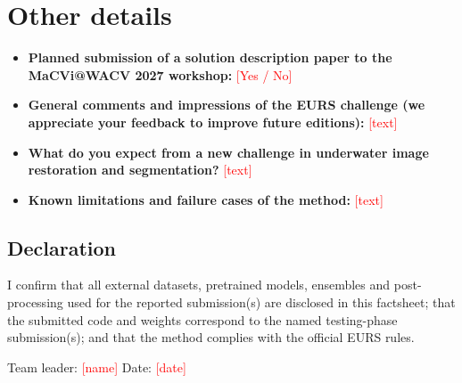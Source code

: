 \documentclass{article}
\newcommand{\todo}[1]{\textcolor{red}{[#1]}}
\begin{document}
\section{Other details}
\begin{itemize}
\item \textbf{Planned submission of a solution description paper to the MaCVi@WACV 2027 workshop:} \todo{Yes / No}
\item \textbf{General comments and impressions of the EURS challenge (we appreciate your feedback to improve future editions):} \todo{text}
\item \textbf{What do you expect from a new challenge in underwater image restoration and segmentation?} \todo{text}
\item \textbf{Known limitations and failure cases of the method:} \todo{text}
\end{itemize}

\subsection*{Declaration}
I confirm that all external datasets, pretrained models, ensembles and post-processing used for the reported submission(s) are disclosed in this factsheet; that the submitted code and weights correspond to the named testing-phase submission(s); and that the method complies with the official EURS rules.

\noindent Team leader: \todo{name} \hfill Date: \todo{date}

{\small


}
\end{document}
